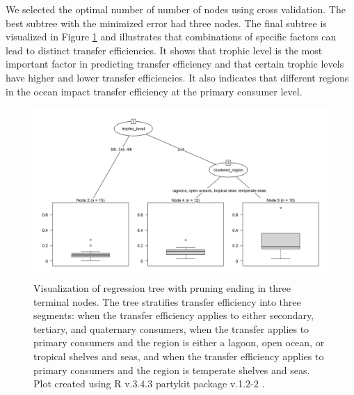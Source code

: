 \documentclass[oneside,12pt,final]{sty/ucthesis-CA2012}
\let\cite\citep                             %
\begin{document}
\begin{mainmatter}
\vspace{5mm}

We selected the optimal number of number of nodes using cross validation. The best subtree with the minimized error had three nodes. The final subtree is visualized in Figure \ref{tree} and illustrates that combinations of specific factors can lead to distinct transfer efficiencies. It shows that trophic level is the most important factor in predicting transfer efficiency and that certain trophic levels have higher and lower transfer efficiencies. It also indicates that different regions in the ocean impact transfer efficiency at the primary consumer level. 

\begin{figure}[H]
     \centering
       \includegraphics[width=\textwidth]{fig/tree}
    \caption{Visualization of regression tree with pruning ending in three terminal nodes. The tree stratifies transfer efficiency into three segments: when the transfer efficiency applies to either secondary, tertiary, and quaternary consumers, when the transfer applies to primary consumers and the region is either a lagoon, open ocean, or tropical shelves and seas, and when the transfer efficiency applies to primary consumers and the region is temperate shelves and seas. Plot created using R v.3.4.3 \cite{Rcite} partykit package v.1.2-2 \cite{hothorn2015partykit}.}
    \label{tree}
\end{figure}


\end{mainmatter}
\end{document}
